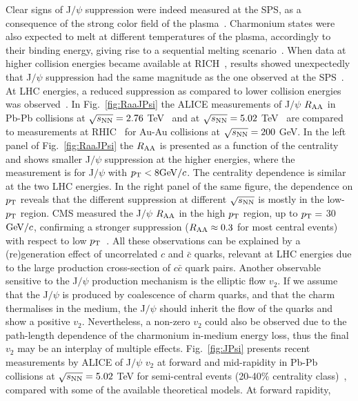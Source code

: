 Clear signs of J$/\psi$ suppression were indeed measured at the SPS, as a 
consequence of the strong color field of the plasma~\cite{Abreu:2000ni}. 
Charmonium states were also expected to melt at different temperatures of 
the plasma, accordingly to their binding energy, giving rise to a sequential melting 
scenario~\cite{Du:2015wha,Digal:2001ue}. When
data at higher collision energies became available 
at RICH~\cite{Adare:2011yf,Adare:2006ns}, results showed unexpectedly that J$/\psi$ suppression 
had the same magnitude as the one observed at the SPS~\cite{Scomparin:2007rt}.
At LHC energies, a reduced suppression as compared to lower
collision energies was observed~\cite{Abelev:2013ila}.
In Fig.~\ref{fig:RaaJPsi} the ALICE measurements 
of J$/\psi$ $R_{\rm AA}$ in Pb-Pb collisions at $\sqrt{s_{\rm NN}} = 2.76$ TeV~\cite{Abelev:2013ila} 
and at $\sqrt{s_{\rm NN}} = 5.02$ TeV~\cite{Adam:2016rdg} are compared to measurements at 
RHIC~\cite{Adare:2011yf} for Au-Au collisions at $\sqrt{s_{\rm NN}} = 200$ GeV. In the left panel of Fig.~\ref{fig:RaaJPsi} 
the $R_{\rm AA}$ is presented as a function of the centrality and shows smaller J$/\psi$ suppression 
at the higher energies, where the measurement is for J$/\psi$ with $p_{\rm T} < 8 \mathrm{GeV}/c$. 
The centrality dependence is similar at the two LHC energies. 
In the right panel of the same figure, the 
dependence on $p_{\rm T}$ reveals that the different suppression at different $\sqrt{s_{\rm NN}}$ is mostly
in the low-$p_{\rm T}$ region.
CMS measured the J$/\psi$ $R_{\rm AA}$ 
in the high $p_{\rm T}$ region, up to $p_{\rm T} = $ 30 $\mathrm{GeV}/c$, confirming a stronger suppression
($R_{\rm AA} \approx 0.3$ for most central events) with respect to 
low $p_{\rm T}$~\cite{Khachatryan:2016ypw}. All these observations can be 
explained by a (re)generation effect of uncorrelated $c$ and $\bar{c}$ quarks, relevant at LHC energies due to the 
large production cross-section of $c\bar{c}$ quark pairs. 
Another observable sensitive to the J$/\psi$ production 
mechanism is the elliptic flow $v_2$. If we assume that the J$/\psi$ is produced by coalescence 
of charm quarks, and that the charm thermalises in the medium, the J$/\psi$ 
should inherit the flow of the quarks and show a positive $v_2$. 
Nevertheless, a non-zero $v_2$ could also be observed due to the path-length dependence of the charmonium
in-medium energy loss, thus the final $v_2$ may be an 
interplay of multiple effects. Fig.~\ref{fig:JPsi} presents recent measurements 
by ALICE of J$/\psi$ $v_2$ at forward and mid-rapidity in Pb-Pb collisions at 
$\sqrt{s_{\rm NN}} = 5.02$ TeV for semi-central events (20-40\% centrality class)~\cite{Acharya:2017tgv}, 
compared with some of the available theoretical models. At forward rapidity, 
